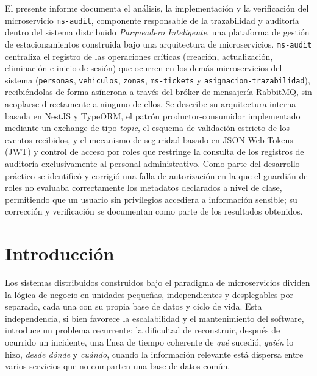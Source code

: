 \documentclass[12pt,letterpaper]{article}
\begin{document}
El presente informe documenta el análisis, la implementación y la verificación del microservicio \texttt{ms-audit}, componente responsable de la trazabilidad y auditoría dentro del sistema distribuido \emph{Parqueadero Inteligente}, una plataforma de gestión de estacionamientos construida bajo una arquitectura de microservicios. \texttt{ms-audit} centraliza el registro de las operaciones críticas (creación, actualización, eliminación e inicio de sesión) que ocurren en los demás microservicios del sistema (\texttt{personas}, \texttt{vehiculos}, \texttt{zonas}, \texttt{ms-tickets} y \texttt{asignacion-trazabilidad}), recibiéndolas de forma asíncrona a través del bróker de mensajería RabbitMQ, sin acoplarse directamente a ninguno de ellos. Se describe su arquitectura interna basada en NestJS y TypeORM, el patrón productor-consumidor implementado mediante un exchange de tipo \emph{topic}, el esquema de validación estricto de los eventos recibidos, y el mecanismo de seguridad basado en JSON Web Tokens (JWT) y control de acceso por roles que restringe la consulta de los registros de auditoría exclusivamente al personal administrativo. Como parte del desarrollo práctico se identificó y corrigió una falla de autorización en la que el guardián de roles no evaluaba correctamente los metadatos declarados a nivel de clase, permitiendo que un usuario sin privilegios accediera a información sensible; su corrección y verificación se documentan como parte de los resultados obtenidos.

\newpage

\section{Introducción}

Los sistemas distribuidos construidos bajo el paradigma de microservicios dividen la lógica de negocio en unidades pequeñas, independientes y desplegables por separado, cada una con su propia base de datos y ciclo de vida. Esta independencia, si bien favorece la escalabilidad y el mantenimiento del software, introduce un problema recurrente: la dificultad de reconstruir, después de ocurrido un incidente, una línea de tiempo coherente de \emph{qué} sucedió, \emph{quién} lo hizo, \emph{desde dónde} y \emph{cuándo}, cuando la información relevante está dispersa entre varios servicios que no comparten una base de datos común.
\end{document}
